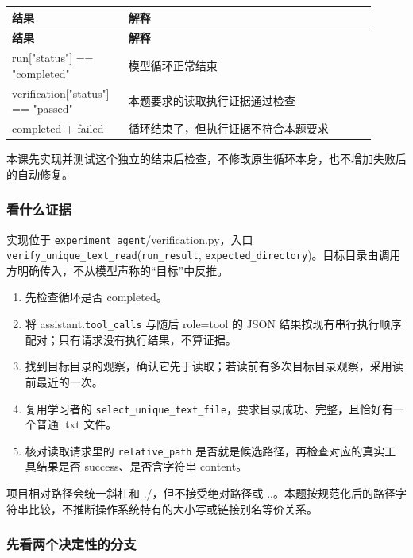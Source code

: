 {\small\setlength{\tabcolsep}{4pt}
\renewcommand{\arraystretch}{1.25}
\begin{longtable}{>{\raggedright\arraybackslash}p{0.28\linewidth}>{\raggedright\arraybackslash}p{0.63\linewidth}}
\toprule
\textbf{结果} & \textbf{解释} \\
\midrule\endfirsthead
\toprule
\textbf{结果} & \textbf{解释} \\
\midrule\endhead
\bottomrule\endfoot
run["status"] == "completed" & 模型循环正常结束 \\
verification["status"] == "passed" & 本题要求的读取执行证据通过检查 \\
completed + failed & 循环结束了，但执行证据不符合本题要求 \\
\end{longtable}}

本课先实现并测试这个独立的结束后检查，不修改原生循环本身，也不增加失败后的自动修复。

\subsubsection{看什么证据}

实现位于 \nolinkurl{experiment_agent}/verification.py，入口 \nolinkurl{verify_unique_text_read}(\nolinkurl{run_result}, \nolinkurl{expected_directory})。目标目录由调用方明确传入，不从模型声称的“目标”中反推。

\begin{enumerate}
\item 先检查循环是否 completed。
\item 将 assistant.\nolinkurl{tool_calls} 与随后 role=tool 的 JSON 结果按现有串行执行顺序配对；只有请求没有执行结果，不算证据。
\item 找到目标目录的观察，确认它先于读取；若读前有多次目标目录观察，采用读前最近的一次。
\item 复用学习者的 \nolinkurl{select_unique_text_file}，要求目录成功、完整，且恰好有一个普通 .txt 文件。
\item 核对读取请求里的 \nolinkurl{relative_path} 是否就是候选路径，再检查对应的真实工具结果是否 success、是否含字符串 content。
\end{enumerate}

项目相对路径会统一斜杠和 ./，但不接受绝对路径或 ..。本题按规范化后的路径字符串比较，不推断操作系统特有的大小写或链接别名等价关系。

\subsubsection{先看两个决定性的分支}

